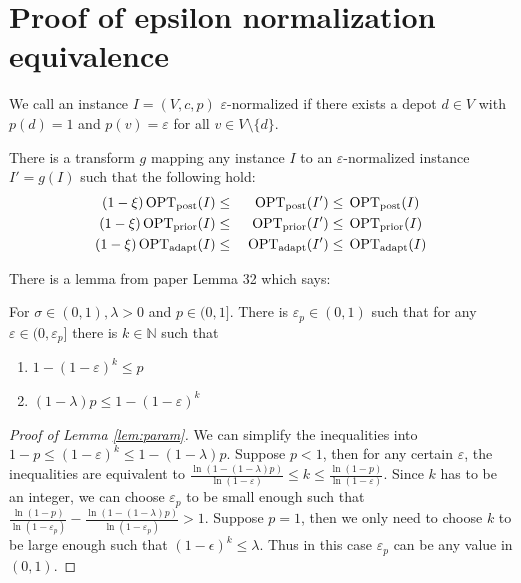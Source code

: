 \documentclass[12pt]{amsart}
\begin{document}

\section{Proof of epsilon normalization equivalence}
We call an instance $I = (V, c, p)$ $\varepsilon$-normalized if there exists a depot $d \in V$ with $p(d) = 1$ and $p(v) = \varepsilon$ for all $v \in V \setminus \{d\}$.

\begin{lemma}\label{lem:transform}
    There is a transform $g$ mapping any instance $I$ to an $\varepsilon$-normalized instance $I' = g(I)$ such that the following hold:
    \begin{alignat*}{2}
        (1-\xi)\operatorname{OPT}_\mathrm{post}(I)  &\le{}& \operatorname{OPT}_\mathrm{post}(I')  &\le{} \operatorname{OPT}_\mathrm{post}(I) \\
        (1-\xi)\operatorname{OPT}_\mathrm{prior}(I) &\le{}& \operatorname{OPT}_\mathrm{prior}(I') &\le{} \operatorname{OPT}_\mathrm{prior}(I) \\
        (1-\xi)\operatorname{OPT}_\mathrm{adapt}(I) &\le{}& \operatorname{OPT}_\mathrm{adapt}(I') &\le{} \operatorname{OPT}_\mathrm{adapt}(I)
    \end{alignat*}
\end{lemma}

There is a lemma from paper \cite{Blauth2024} Lemma 32 which says:

\begin{lemma}\label{lem:param}
    For  $\sigma \in (0, 1), \lambda > 0$ and $p \in (0, 1]$. There is $\varepsilon_p \in (0, 1)$ such that for any $\varepsilon \in (0, \varepsilon_p ]$ there is $k \in \mathbb{N}$ such that 
    \begin{enumerate}
        \item $1 - (1-\varepsilon)^k \le p$
        \item $(1-\lambda)p \le 1-(1-\varepsilon)^k$
    \end{enumerate}
\end{lemma}

\begin{proof}[Proof of Lemma \ref{lem:param}]
    We can simplify the inequalities into $1 - p \le (1-\varepsilon)^k \le 1 - (1-\lambda)p$. Suppose $p < 1$, then for any certain $\varepsilon$, the inequalities are equivalent to $\frac{\ln (1 - (1-\lambda)p)}{\ln (1 - \varepsilon)} \le k \le \frac{\ln (1 - p)}{\ln (1 - \varepsilon)}$. Since $k$ has to be an integer, we can choose $\varepsilon_p$ to be small enough such that $\frac{\ln (1 - p)}{\ln (1 - \varepsilon_p)} - \frac{\ln (1 - (1-\lambda)p)}{\ln (1 - \varepsilon_p)} > 1$. Suppose $p = 1$, then we only need to choose $k$ to be large enough such that $(1-\epsilon)^k \le \lambda$. Thus in this case $\varepsilon_p$ can be any value in $(0,1)$.
\end{proof}
\end{document}
